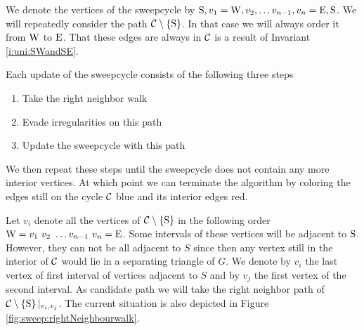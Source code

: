   We denote the  vertices of the sweepcycle by $\mathrm{S}, v_1 = \mathrm{W}, v_2, \ldots v_{n-1}, v_n = \mathrm{E}, \mathrm{S}$.   We will repeatedly consider the path $\mathcal{C} \setminus \left\lbrace {\mathrm{S}} \right\rbrace$. In that case we will always order it from $\mathrm{W}$ to $\mathrm{E}$. That these edges are always in $\mathcal{C}$ is a result of Invariant \ref{i:uni:SWandSE}.


  Each update of the sweepcycle consists of the following three steps
  \begin{enumerate}
    \itemsep=-4pt
    \item Take the right neighbor walk
    \item Evade irregularities on this path
    \item Update the sweepcycle with this path
  \end{enumerate}

  We then repeat these steps until the sweepcycle does not contain any more interior vertices. At which point we can terminate the algorithm by coloring the edges still on the cycle $\mathcal{C}$ blue and its interior edges red.

    Let $v_i$ denote all the vertices of $\mathcal{C} \setminus \left\lbrace {\mathrm{S}} \right\rbrace$ in the following order $\mathrm{W} =  v_1 \  v_2 \  \ldots v_{n-1} \  v_n = \mathrm{E}$.
    Some intervals of these vertices will be adjacent to $\mathrm{S}$. However, they can not be all adjacent to $S$ since then any vertex still in the interior of $\mathcal{C}$ would lie in a separating triangle of $G$. We denote by $v_i$ the last vertex of first interval of vertices adjacent to $S$ and by $v_j$ the first vertex of the second interval.
    As candidate path we will take the right neighbor path of $\mathcal{C} \setminus \left\lbrace {\mathrm{S}} \right\rbrace|_{v_i, v_j}$.
    The current situation is also depicted in Figure \ref{fig:sweep:rightNeighbourwalk}.

